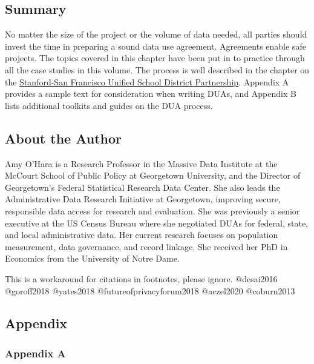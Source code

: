 \documentclass[
]{WileySix}
\begin{document}
\hypertarget{summary}{%
\subsection{Summary}\label{summary}}

No matter the size of the project or the volume of data needed, all parties should invest the time in preparing a sound data use agreement. Agreements enable safe projects. The topics covered in this chapter have been put in to practice through all the case studies in this volume. The process is well described in the chapter on the \protect\hyperlink{sfusd}{Stanford-San Francisco Unified School District Partnership}. Appendix A provides a sample text for consideration when writing DUAs, and Appendix B lists additional toolkits and guides on the DUA process.

\hypertarget{about-the-author}{%
\subsection*{About the Author}\label{about-the-author}}

Amy O'Hara is a Research Professor in the Massive Data Institute at the McCourt School of Public Policy at Georgetown University, and the Director of Georgetown's Federal Statistical Research Data Center. She also leads the Administrative Data Research Initiative at Georgetown, improving secure, responsible data access for research and evaluation. She was previously a senior executive at the US Census Bureau where she negotiated DUAs for federal, state, and local administrative data. Her current research focuses on population measurement, data governance, and record linkage. She received her PhD in Economics from the University of Notre Dame.

\begin{invisible}
This is a workaround for citations in footnotes, please ignore.
@desai2016 @goroff2018 @yates2018 @futureofprivacyforum2018 @aczel2020
@coburn2013
\end{invisible}

\hypertarget{appendix}{%
\subsection*{Appendix}\label{appendix}}

\hypertarget{appendix-a}{%
\subsubsection*{Appendix A}\label{appendix-a}}
\end{document}
